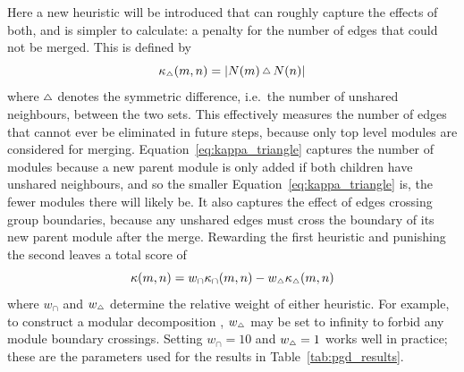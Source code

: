 Here a new heuristic will be introduced that can roughly capture the effects of both, and is simpler to calculate: a penalty for the number of edges that could not be merged. This is defined by
\begin{equation}
  \kappa_{\Triangle}(m, n) = |N(m)\,\Triangle\,N(n)|
  \label{eq:kappa_triangle}
\end{equation}
where $\Triangle$ denotes the symmetric difference, i.e.\ the number of unshared neighbours, between the two sets. This effectively measures the number of edges that cannot ever be eliminated in future steps, because only top level modules are considered for merging.
Equation~\eqref{eq:kappa_triangle} captures the number of modules because a new parent module is only added if both children have unshared neighbours, and so the smaller Equation~\eqref{eq:kappa_triangle} is, the fewer modules there will likely be. It also captures the effect of edges crossing group boundaries, because any unshared edges must cross the boundary of its new parent module after the merge.
Rewarding the first heuristic and punishing the second leaves a total score of
\begin{equation}
  \kappa(m,n) =
  w_\cap \kappa_\cap(m,n) -
  w_{\Triangle} \kappa_{\Triangle}(m,n)
  \label{eq:kappa_full}
\end{equation}
where $w_\cap$ and $w_{\Triangle}$ determine the relative weight of either heuristic. For example, to construct a modular decomposition \cite{Habib2004}, $w_{\Triangle}$ may be set to infinity to forbid any module boundary crossings.
Setting $w_\cap=10$ and $w_{\Triangle}=1$ works well in practice; these are the parameters used for the results in Table~\ref{tab:pgd_results}.

